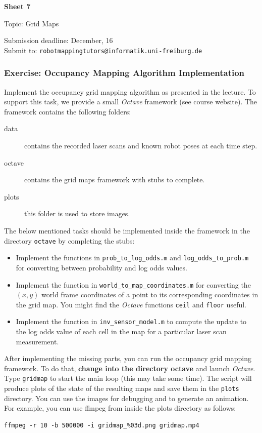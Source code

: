 \documentclass[12pt]{article}
\begin{document}


\begin{center}
  {\bf \Large Sheet 7}

  {\large Topic: Grid Maps}

  Submission deadline: December, 16\\
  Submit to: \texttt{robotmappingtutors@informatik.uni-freiburg.de}
\end{center}

\subsubsection*{Exercise: Occupancy Mapping Algorithm Implementation}

Implement the occupancy grid mapping algorithm as presented in the
lecture. To support this task, we provide a small \emph{Octave} framework (see
course website).  The framework contains the following folders:

\begin{description}
  \item [data]
    contains the recorded laser scans and known robot poses at each time step.
  \item [octave]
    contains the grid maps framework with stubs to complete.
  \item [plots]
    this folder is used to store images.
\end{description}

The below mentioned tasks should be implemented inside the framework in
the directory \texttt{octave} by completing the stubs:

\begin{itemize}
  \item
    Implement the functions in \texttt{prob\_to\_log\_odds.m} and
    \texttt{log\_odds\_to\_prob.m} for converting between probability
    and log odds values.
  \item
    Implement the function in \texttt{world\_to\_map\_coordinates.m} for
    converting the $(x,y)$ world frame coordinates of a point to its
    corresponding coordinates in the grid map. You might find the
    \emph{Octave} functions \texttt{ceil} and \texttt{floor} useful.
  \item
    Implement the function in \texttt{inv\_sensor\_model.m} to compute
    the update to the log odds value of each cell in the map for a
    particular laser scan measurement.
\end{itemize}

After implementing the missing parts, you can run the occupancy grid
mapping framework.  To do that, \textbf{change into the directory
octave} and launch \emph{Octave}.  Type \texttt{gridmap} to start the
main loop (this may take some time).  The script will produce plots of
the state of the resulting maps and save them in the \texttt{plots}
directory.  You can use the images for debugging and to generate an
animation. For example, you can use ffmpeg from inside the plots
directory as follows:
\begin{verbatim}
ffmpeg -r 10 -b 500000 -i gridmap_%03d.png gridmap.mp4
\end{verbatim}
\end{document}
